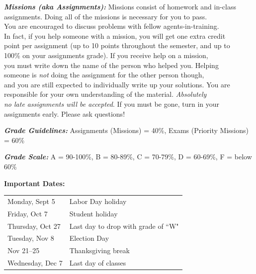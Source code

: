 \documentclass[10pt]{extarticle}
\begin{document}
\emph{\bf Missions (aka Assignments):}
Missions consist of homework and in-class\\
assignments. Doing all of the missions is necessary for you to pass.\\
You are encouraged to discuss problems with fellow agents-in-training.\\
In fact, if you help someone with a mission, you will get one extra credit\\
point per assignment (up to 10 points throughout the semester, and up to\\
100\% on your assignments grade).  If you receive help on a mission,\\
you must write down the name of the person who helped you.  Helping\\
someone is \emph{not} doing the assignment for the other person though,\\
and you are still expected to individually write up your solutions.  You are\\
responsible for your own understanding of the material. \emph{Absolutely\\
no late assignments will be accepted}. If you must be gone, turn in your\\
assignments early. Please ask questions!

\vspace{10pt}

\emph{\bf Grade Guidelines:}  Assignments (Missions) = 40\%, Exams (Priority Missions) = 60\%


\vspace{10pt}

\emph{\bf Grade Scale:}
A = 90-100\%, B = 80-89\%, C = 70-79\%, D = 60-69\%, F = below 60\%
	
\vspace{10pt}

\noindent
\textbf{Important Dates:}
\begin{center}
\begin{tabular}{ll}
Monday, Sept 5 & Labor Day holiday\\
Friday, Oct 7 & Student holiday\\
Thursday, Oct 27 &Last day to drop with grade of ``W"\\
Tuesday, Nov 8 & Election Day\\
Nov 21--25 &Thanksgiving break\\
Wednesday, Dec 7 & Last day of classes\\
\end{tabular}
\end{center}
\end{document}
